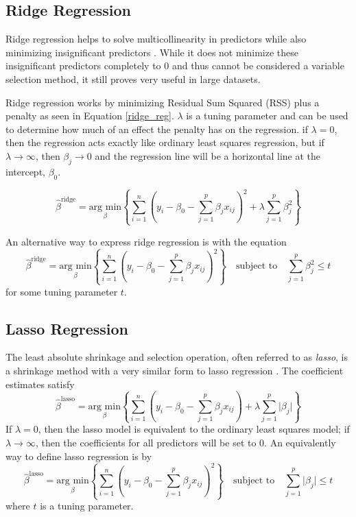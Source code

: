 \documentclass{article}
\newcommand{\argmin}[1]{\underset{\beta}{\text{arg min}}}
\begin{document}
\subsection{Ridge Regression}
Ridge regression helps to solve multicollinearity in predictors while also minimizing insignificant predictors \cite{hoerl1970ridge}. While it does not minimize these insignificant predictors completely to 0 and thus cannot be considered a variable selection method, it still proves very useful in large datasets.

Ridge regression works by minimizing Residual Sum Squared (RSS) plus a penalty as seen in Equation \ref{ridge_reg}. $\lambda$ is a tuning parameter and can be used to determine how much of an effect the penalty has on the regression. if $\lambda=0$, then the regression acts exactly like ordinary least squares regression, but if $\lambda \rightarrow \infty$, then $\beta_j \rightarrow 0$ and the regression line will be a horizontal line at the intercept, $\beta_0$.

\begin{equation}
	\hat{\beta}^{\text{ridge}} = \argmin{\beta}\left\{ \sum_{i=1}^{n} \left( y_i - \beta_0 - \sum_{j=1}^{p} \beta_jx_{ij} \right)^2 + \lambda \sum_{j=1}^{p} \beta_j^2  \right\}
	\label{ridge_reg}
\end{equation}

An alternative way to express ridge regression is with the equation
\begin{equation}
	\hat{\beta}^{\text{ridge}} = \argmin{\beta}\left\{ \sum_{i=1}^{n} \left( y_i - \beta_0 - \sum_{j=1}^{p} \beta_jx_{ij} \right)^2\right\}\quad\text{subject to}\quad \sum_{j=1}^{p} \beta_j^2\leq t
\end{equation}
for some tuning parameter $t$.

\subsection{Lasso Regression}

The least absolute shrinkage and selection operation, often referred to as \textit{lasso}, is a shrinkage method with a very similar form to lasso regression \cite{tibshirani1996regression, james2017islr, james2013introduction}. The coefficient estimates satisfy
\begin{equation}
	\hat{\beta}^{\text{lasso}}=\argmin{\beta}\left\{ \sum\limits_{i = 1}^n \left( y_i - \beta_0 - \sum\limits_{j = 1}^p \beta_j x_{ij} \right) + \lambda\sum\limits_{j = 1}^p \vert \beta_j \vert \right\}
\end{equation}
If $\lambda = 0$, then the lasso model is equivalent to the ordinary least squares model; if $\lambda \to \infty$, then the coefficients for all predictors will be set to 0. An equivalently way to define lasso regression is by
\begin{equation}
	\hat{\beta}^{\text{lasso}} = \argmin{\beta}\left\{ \sum_{i=1}^{n} \left( y_i - \beta_0 - \sum_{j=1}^{p} \beta_jx_{ij} \right)^2 \right\}\quad\text{subject to}\quad \sum_{j=1}^{p} \vert \beta_j \vert\leq t
\end{equation}
where $t$ is a tuning parameter.
\end{document}
